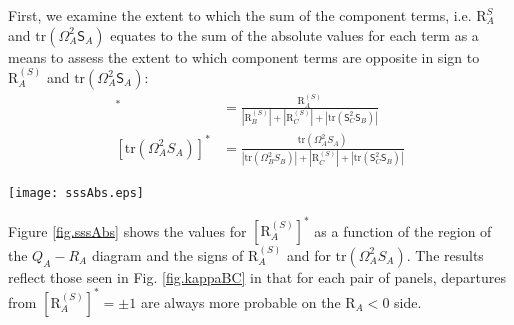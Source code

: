 \documentclass[preprint,amssymb,amsmath,aip,cha]{revtex4-1}
\begin{document}
First, we examine the extent to which the sum of the component terms, i.e. $\mbox{R}^{S}_{A}$ and $\mbox{tr}(\mathsf{\Omega}_{A}^{2}\mathsf{S}_{A})$ equates to the sum of the absolute values for each term as a means to assess the extent to which component terms are opposite in sign to $\mbox{R}^{(S)}_{A}$ and $\mbox{tr}(\mathsf{\Omega}_{A}^{2}\mathsf{S}_{A})$:
\begin{align}
[\mbox{R}^{(S)}_{A}]^{*} &= \frac{\mbox{R}^{(S)}_{A}}{|\mbox{R}_{B}^{(S)}| + |\mbox{R}_{C}^{(S)}| + |\mbox{tr}(\mathsf{S}_{C}^{2}\mathsf{S}_{B})|} \\
[\mbox{tr}(\Omega^{2}_{A}{S}_{A})]^{*} &= \frac{\mbox{tr}(\Omega^{2}_{A}{S}_{A})}{|\mbox{tr}(\Omega^{2}_{B}{S}_{B})| + |\mbox{R}_{C}^{(S)}| + |\mbox{tr}(\mathsf{S}_{C}^{2}\mathsf{S}_{B})|}
\end{align}

\begin{figure*}
  \texttt{[image: sssAbs.eps]}
\caption{Probability curves for $[\mbox{R}^{(S)}_{A}]^{*}$ as a function of the six regions of the $Q_{A}-R_{A}$ diagram and the four possible states of the strain production and enstrophy production for $\mathsf{A}$ and truncated just inside the limits of $[\mbox{R}^{(S)}_{A}]^{*} = \pm 1$. Results are normalized such that the integrated probability in each of the panels is unity. The numbers in each panel are the values for $ [\mbox{R}^{(S)}_{A}]^{*} = -1$ (left-hand panels) and $ [\mbox{R}^{(S)}_{A}]^{*} = 1$ (right-hand panels), where the grey numbers correspond to $\mbox{R}^{(S)}_{A} < 0$ and the black $\mbox{R}^{(S)}_{A} > 0$, where the top numbers in each panel are where the sign for $\mbox{R}^{(S)}_{A}$ and for $\mbox{tr}(\Omega^{2}_{A}{S}_{A})$ are the same.}
\label{fig.sssAbs}       %
\end{figure*}

Figure \ref{fig.sssAbs} shows the values for $[\mbox{R}^{(S)}_{A}]^{*}$ as a function of the region of the $Q_{A}-R_{A}$ diagram and the signs of $\mbox{R}^{(S)}_{A}$ and for $\mbox{tr}(\Omega^{2}_{A}{S}_{A})$. The results reflect those seen in Fig. \ref{fig.kappaBC} in that for each pair of panels, departures from $[\mbox{R}^{(S)}_{A}]^{*} = \pm 1$ are always more probable on the $\mbox{R}_{A} < 0$ side.
\end{document}
